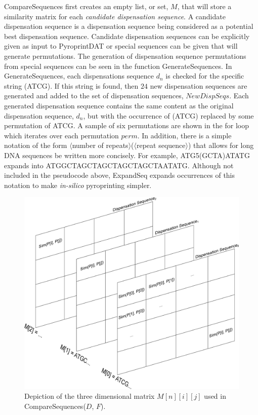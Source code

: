 \documentclass[12pt]{ucthesis}
\begin{document}
      \textsf{CompareSequences} first creates an empty list, or set, $M$, that
      will store a similarity matrix for each \textit{candidate dispensation
      sequence}. A candidate dispensation sequence is a dispensation sequence
      being considered as a potential best dispensation sequence. Candidate
      dispensation sequences can be explicitly given as input to PyroprintDAT
      or special sequences can be given that will generate permutations. The
      generation of dispensation sequence permutations from special sequences
      can be seen in the function \textsf{GenerateSequences}. In
      \textsf{GenerateSequences}, each dispensations sequence $d_n$ is checked
      for the specific string \textnormal{(ATCG)}. If this string is found,
      then $24$ new dispensation sequences are generated and added to the set
      of dispensation sequences, $NewDispSeqs$. Each generated dispensation
      sequence contains the same content as the original dispensation sequence,
      $d_n$, but with the occurrence of \textnormal{(ATCG)} replaced by some
      permutation of \textnormal{ATCG}. A sample of six permutations are shown
      in the for loop which iterates over each permutation $perm$. In addition,
      there is a simple notation of the form \textnormal{$\langle$number of
      repeats$\rangle$($\langle$repeat sequence$\rangle$)} that allows for long
      DNA sequences be written more concisely. For example,
      \textnormal{ATG5(GCTA)ATATG} expands into
      \textnormal{ATGGCTAGCTAGCTAGCTAGCTAATATG}. Although not included in the
      pseudocode above, \textsf{ExpandSeq} expands occurrences of this notation
      to make \textit{in-silico} pyroprinting simpler.

      \begin{figure}[t]
         \centering
         \includegraphics[width=0.7\columnwidth]{graphics/PyroprintSimilarityMatrices.eps}
         \caption{Depiction of the three dimensional matrix $M[n][i][j]$
                  used in CompareSequences($D$, $F$).}
         \label{fig:pyro_matrices}
      \end{figure}
\end{document}

